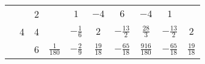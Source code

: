 \begin{table}[H]
\begin{tabular}{|c|c|c|c|c|c|c|c|c|c|}
                                                      & \multirow{3}{*}{4}           & 2                           &                  & $1$              & $-4$            & $6$              & $-4$              & $1$                &                  \\ \cline{3-10}
                                                      &                              & 4                           &                  & $-\frac{1}{6}$   & $2$             & $-\frac{13}{2}$  & $\frac{28}{3}$    & $-\frac{13}{2}$    & $2$              \\ \cline{3-10}
                                                      &                              & 6                           & $\frac{1}{180}$  & $-\frac{2}{9}$   & $\frac{19}{18}$ & $-\frac{65}{18}$ & $\frac{916}{180}$ & $-\frac{65}{18}$   & $\frac{19}{18}$  \\ \hline


\end{tabular}
\end{table}
